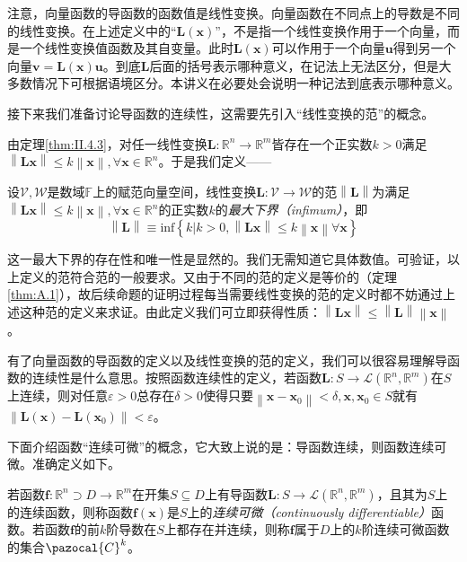 \documentclass[main.tex]{subfiles}
\begin{document}
注意，向量函数的导函数的函数值是线性变换。向量函数在不同点上的导数是不同的线性变换。在上述定义中的“$\mathbf{L}\left(\mathbf{x}\right)$”，不是指一个线性变换作用于一个向量，而是一个线性变换值函数及其自变量。此时$\mathbf{L}\left(\mathbf{x}\right)$可以作用于一个向量$\mathbf{u}$得到另一个向量$\mathbf{v}=\mathbf{L}\left(\mathbf{x}\right)\mathbf{u}$。到底$\mathbf{L}$后面的括号表示哪种意义，在记法上无法区分，但是大多数情况下可根据语境区分。本讲义在必要处会说明一种记法到底表示哪种意义。

接下来我们准备讨论导函数的连续性，这需要先引入“线性变换的范”的概念。

由定理\ref{thm:II.4.3}，对任一线性变换$\mathbf{L}:\mathbb{R}^n\rightarrow\mathbb{R}^m$皆存在一个正实数$k>0$满足$\left\|\mathbf{Lx}\right\|\leq k\left\|\mathbf{x}\right\|,\forall\mathbf{x}\in\mathbb{R}^n$。于是我们定义——
\begin{definition}[线性变换的范]\label{def:II.4.16}
    设$\mathcal{V},\mathcal{W}$是数域$\mathbb{F}$上的赋范向量空间，线性变换$\mathbf{L}:\mathcal{V}\rightarrow\mathcal{W}$的范$\left\|\mathbf{L}\right\|$为满足$\left\|\mathbf{Lx}\right\|\leq k\left\|\mathbf{x}\right\|,\forall\mathbf{x}\in\mathbb{R}^n$的正实数$k$的\emph{最大下界（infimum）}，即
    \[\left\|\mathbf{L}\right\|\equiv\mathrm{inf}\left\{k|k>0,\left\|\mathbf{Lx}\right\|\leq k\left\|\mathbf{x}\right\|\forall\mathbf{x}\right\}\]
\end{definition}

这一最大下界的存在性和唯一性是显然的。我们无需知道它具体数值。可验证，以上定义的范符合范的一般要求。又由于不同的范的定义是等价的（定理\ref{thm:A.1}），故后续命题的证明过程每当需要线性变换的范的定义时都不妨通过上述这种范的定义来求证。由此定义我们可立即获得性质：$\left\|\mathbf{Lx}\right\|\leq\left\|\mathbf{L}\right\|\left\|\mathbf{x}\right\|$。

有了向量函数的导函数的定义以及线性变换的范的定义，我们可以很容易理解导函数的连续性是什么意思。按照函数连续性的定义，若函数$\mathbf{L}:S\rightarrow\mathcal{L}\left(\mathbb{R}^n,\mathbb{R}^m\right)$在$S$上连续，则对任意$\varepsilon>0$总存在$\delta>0$使得只要$\left\|\mathbf{x}-\mathbf{x}_0\right\|<\delta,\mathbf{x},\mathbf{x}_0\in S$就有$\left\|\mathbf{L}\left(\mathbf{x}\right)-\mathbf{L}\left(\mathbf{x}_0\right)\right\|<\varepsilon$。

下面介绍函数“连续可微”的概念，它大致上说的是：导函数连续，则函数连续可微。准确定义如下。

\begin{definition}[连续可微函数]\label{def:II.4.17}
    若函数$\mathbf{f}:\mathbb{R}^n\supset D\rightarrow\mathbb{R}^m$在开集$S\subseteq D$上有导函数$\mathbf{L}:S\rightarrow\mathcal{L}\left(\mathbb{R}^n,\mathbb{R}^m\right)$，且其为$S$上的连续函数，则称函数$\mathbf{f}\left(\mathbf{x}\right)$是$S$上的\emph{连续可微（continuously differentiable）}函数。若函数$\mathbf{f}$的前$k$阶导数在$S$上都存在并连续，则称$\mathbf{f}$属于$D$上的$k$阶连续可微函数的集合$\pazocal{C}^k$。
\end{definition}
\end{document}
